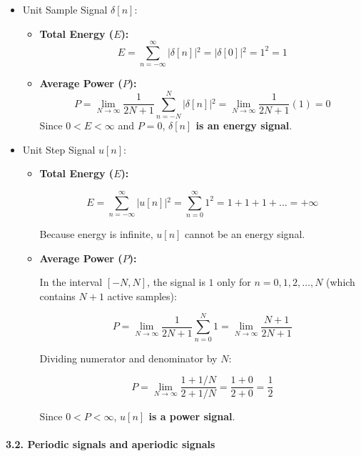 \begin{itemize}
\tightlist
\item
  Unit Sample Signal \(\delta[n]\):

  \begin{itemize}
  \tightlist
  \item
    \textbf{Total Energy (\(E\)):}
    \[E = \sum_{n=-\infty}^{\infty} \vert{}\delta[n]\vert{}^2 = \vert{}\delta[0]\vert{}^2 = 1^2 = 1\]
  \item
    \textbf{Average Power (\(P\)):}
    \[P = \lim_{N\to\infty} \frac{1}{2N+1} \sum_{n=-N}^{N} \vert{}\delta[n]\vert{}^2 = \lim_{N\to\infty} \frac{1}{2N+1} (1) = 0\]
    Since \(0 < E < \infty\) and \(P = 0\), \textbf{\(\delta[n]\) is an
    energy signal}.
  \end{itemize}
\item
  Unit Step Signal \(u[n]\):

  \begin{itemize}
  \item
    \textbf{Total Energy (\(E\)):}

    \[E = \sum_{n=-\infty}^{\infty} \vert{}u[n]\vert{}^2 = \sum_{n=0}^{\infty} 1^2 = 1 + 1 + 1 + \dots = +\infty\]

    Because energy is infinite, \(u[n]\) cannot be an energy signal.
  \item
    \textbf{Average Power (\(P\)):}

    In the interval \([-N, N]\), the signal is \(1\) only for
    \(n = 0, 1, 2, \dots, N\) (which contains \(N + 1\) active samples):

    \[P = \lim_{N\to\infty} \frac{1}{2N+1} \sum_{n=0}^{N} 1 = \lim_{N\to\infty} \frac{N+1}{2N+1}\]

    Dividing numerator and denominator by \(N\):

    \[P = \lim_{N\to\infty} \frac{1 + 1/N}{2 + 1/N} = \frac{1 + 0}{2 + 0} = \frac{1}{2}\]

    Since \(0 < P < \infty\), \textbf{\(u[n]\) is a power signal}.
  \end{itemize}
\end{itemize}

\paragraph{3.2. Periodic signals and aperiodic
signals}\label{periodic-signals-and-aperiodic-signals}

